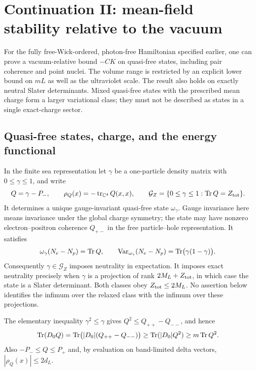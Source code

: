 \section{Continuation II: mean-field stability relative to the vacuum}
\label{sec:meanfield}

For the fully free-Wick-ordered, photon-free Hamiltonian specified earlier,
one can prove a vacuum-relative bound $-CK$ on quasi-free states, including
pair coherence and point nuclei.  The volume range is restricted by an
explicit lower bound on $mL$ as well as the ultraviolet scale.  The result
also holds on exactly neutral Slater determinants.  Mixed quasi-free states
with the prescribed mean charge form a larger variational class; they must
not be described as states in a single exact-charge sector.

\subsection{Quasi-free states, charge, and the energy functional}

In the finite sea representation let $\gamma$ be a one-particle density
matrix with $0\le\gamma\le1$, and write
\[
 Q=\gamma-P_-,\qquad
 \rho_Q(x)=-\operatorname{tr}_{\mathbb C^4}Q(x,x),\qquad
 \mathcal G_Z=\{0\le\gamma\le1:\operatorname{Tr} Q=Z_{\rm tot}\}.
\]
It determines a unique gauge-invariant quasi-free state $\omega_\gamma$.
Gauge invariance here means invariance under the global charge symmetry;
the state may have nonzero electron--positron coherence $Q_{+-}$ in the
free particle--hole representation.  It satisfies
\[
 \omega_\gamma(N_e-N_p)=\operatorname{Tr} Q,
 \qquad
 \operatorname{Var}_{\omega_\gamma}(N_e-N_p)
 =\operatorname{Tr}\bigl(\gamma(1-\gamma)\bigr).
\]
Consequently $\gamma\in\mathcal G_Z$ imposes neutrality in expectation.
It imposes exact neutrality precisely when $\gamma$ is a projection of
rank $2M_L+Z_{\rm tot}$, in which case the state is a Slater determinant.
Both classes obey $Z_{\rm tot}\le2M_L$.  No assertion below identifies the
infimum over the relaxed class with the infimum over these projections.

The elementary inequality $\gamma^2\le\gamma$ gives
$Q^2\le Q_{++}-Q_{--}$, and hence
\begin{equation}
 \operatorname{Tr}(D_0Q)
 =\operatorname{Tr}\bigl(|D_0|(Q_{++}-Q_{--})\bigr)
 \ge\operatorname{Tr}(|D_0|Q^2)\ge m\operatorname{Tr} Q^2.
 \label{eq:kin-mf}
\end{equation}
Also $-P_-\le Q\le P_+$ and, by evaluation on band-limited delta vectors,
$|\rho_Q(x)|\le2d_L$.


